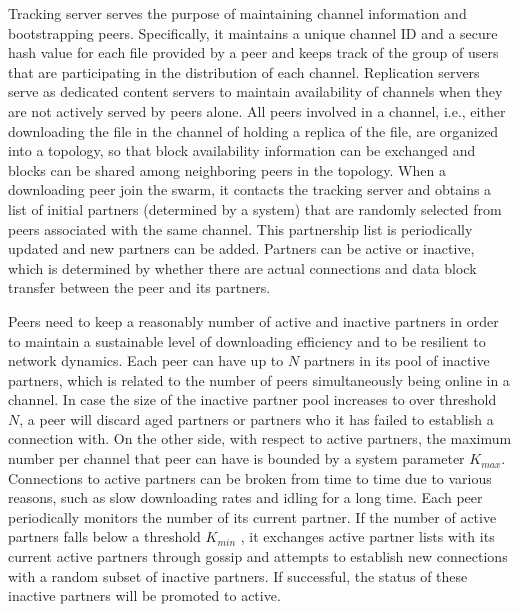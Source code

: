 \documentclass[conference]{IEEEtran}
\begin{document}
Tracking server serves the purpose of maintaining channel information and bootstrapping peers.
Specifically, it maintains a unique channel ID and a secure hash value for each file provided by a peer and keeps track of the group of users that are participating in the distribution of each channel. 
Replication servers serve as dedicated content servers to maintain availability of channels when they are not actively served by peers alone. 
All peers involved in a channel, i.e., either downloading the file in the channel of holding a replica of the file, are organized into a topology, so that block availability information can be exchanged and blocks can be shared among neighboring peers in the topology.
When a downloading peer join the swarm, it contacts the tracking server and obtains a list of initial partners (determined by a system) that are randomly selected from peers associated with the same channel.  
This partnership list is periodically updated and new partners can be added. 
Partners can be active or inactive, which is determined by whether there are actual connections and data block transfer between the peer and its partners.

Peers need to keep a reasonably number of active and inactive partners in order to maintain a sustainable level of downloading efficiency and to be resilient to network dynamics. 
Each peer can have up to $N$ partners in its pool of inactive partners, which is related to the number of peers simultaneously being online in a channel.
In case the size of the inactive partner pool increases to over threshold $N$, a peer will discard aged partners or partners who it has failed to establish a connection with. 
On the other side, with respect to active partners, the maximum number per channel that peer can have is bounded by a system parameter $K_{max}$.
Connections to active partners can be broken from time to time due to various reasons, such as slow downloading rates and idling for a long time.
Each peer periodically monitors the number of its current partner. 
If the number of active partners falls below a threshold $K_{min}$ , it exchanges active partner lists with its current active partners through gossip and attempts to establish new connections with a random subset of inactive partners.
If successful, the status of these inactive partners will be promoted to active. 
\end{document}
